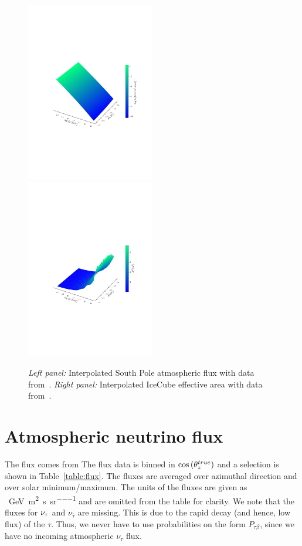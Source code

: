 \documentclass{thesis}
\begin{document}
\begin{figure}[t]\label{fig:flux_aeff}
    \includegraphics[width=0.5\textwidth]{figures/flux.pdf}\hspace{-1cm}
    \includegraphics[width=0.5\textwidth]{figures/aeff.pdf}
    \vspace{-2.5cm}\caption{\emph{Left panel:} Interpolated South Pole atmospheric flux with data from~\cite{hondaArticle}.
    \emph{Right panel:} Interpolated IceCube effective area with data from~\cite{ICaeff}.}
\end{figure}

\section{Atmospheric neutrino flux}
The flux comes from \cite{hondaArticle} %
The flux data is binned in $\cos{(\theta_z^{true})}$ and a selection is shown in Table~\ref{table:flux}. The fluxes are averaged over azimuthal direction and over solar minimum/maximum. 
The units of the fluxes are given as \si{\per\GeV \per\metre\squared \per\second \per\steradian} and are omitted
from the table for clarity. 
We note that the fluxes for $\nu_\tau$ and $\nu_{\bar{\tau}}$ are missing. This is due to the rapid decay (and hence, low flux) of the $\tau$. 
Thus, we never have to use probabilities on the form 
$P_{\tau \beta}$, since we have no incoming atmospheric $\nu_\tau$ flux. 
\end{document}
